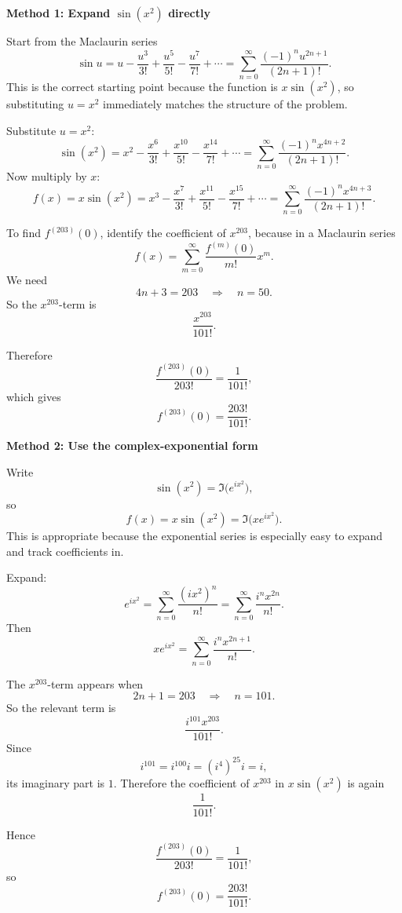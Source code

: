 \documentclass[a4paper,12pt,twocolumn]{article}
\newenvironment{solutionbox}{\begin{framed}}{\end{framed}}
\begin{document}
\begin{solutionbox}
\textbf{Method 1: Expand \(\sin(x^2)\) directly}

\begin{steps}
\item Start from the Maclaurin series
\[
\sin u=u-\frac{u^3}{3!}+\frac{u^5}{5!}-\frac{u^7}{7!}+\cdots
=\sum_{n=0}^{\infty}\frac{(-1)^n u^{2n+1}}{(2n+1)!}.
\]
This is the correct starting point because the function is \(x\sin(x^2)\), so substituting \(u=x^2\) immediately matches the structure of the problem.

\item Substitute \(u=x^2\):
\[
\sin(x^2)=x^2-\frac{x^6}{3!}+\frac{x^{10}}{5!}-\frac{x^{14}}{7!}+\cdots
=\sum_{n=0}^{\infty}\frac{(-1)^n x^{4n+2}}{(2n+1)!}.
\]
Now multiply by \(x\):
\[
f(x)=x\sin(x^2)
=x^3-\frac{x^7}{3!}+\frac{x^{11}}{5!}-\frac{x^{15}}{7!}+\cdots
=\sum_{n=0}^{\infty}\frac{(-1)^n x^{4n+3}}{(2n+1)!}.
\]

\item To find \(f^{(203)}(0)\), identify the coefficient of \(x^{203}\), because in a Maclaurin series
\[
f(x)=\sum_{m=0}^{\infty}\frac{f^{(m)}(0)}{m!}x^m.
\]
We need
\[
4n+3=203
\quad\Longrightarrow\quad
n=50.
\]
So the \(x^{203}\)-term is
\[
\frac{x^{203}}{101!}.
\]

\item Therefore
\[
\frac{f^{(203)}(0)}{203!}=\frac{1}{101!},
\]
which gives
\[
\boxed{f^{(203)}(0)=\frac{203!}{101!}}.
\]
\end{steps}
\end{solutionbox}

\begin{solutionbox}
\textbf{Method 2: Use the complex-exponential form}

\begin{steps}
\item Write
\[
\sin(x^2)=\Im\!\bigl(e^{ix^2}\bigr),
\]
so
\[
f(x)=x\sin(x^2)=\Im\!\bigl(xe^{ix^2}\bigr).
\]
This is appropriate because the exponential series is especially easy to expand and track coefficients in.

\item Expand:
\[
e^{ix^2}=\sum_{n=0}^{\infty}\frac{(ix^2)^n}{n!}
=\sum_{n=0}^{\infty}\frac{i^n x^{2n}}{n!}.
\]
Then
\[
xe^{ix^2}=\sum_{n=0}^{\infty}\frac{i^n x^{2n+1}}{n!}.
\]

\item The \(x^{203}\)-term appears when
\[
2n+1=203
\quad\Longrightarrow\quad
n=101.
\]
So the relevant term is
\[
\frac{i^{101}x^{203}}{101!}.
\]
Since
\[
i^{101}=i^{100}i=(i^4)^{25}i=i,
\]
its imaginary part is \(1\). Therefore the coefficient of \(x^{203}\) in \(x\sin(x^2)\) is again
\[
\frac{1}{101!}.
\]

\item Hence
\[
\frac{f^{(203)}(0)}{203!}=\frac{1}{101!},
\]
so
\[
\boxed{f^{(203)}(0)=\frac{203!}{101!}}.
\]
\end{steps}
\end{solutionbox}
\end{document}
